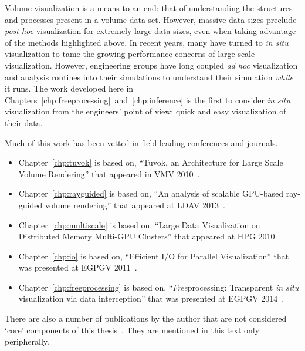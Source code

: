 Volume visualization is a means to an end: that of understanding the
structures and processes present in a volume data set.  However,
massive data
sizes preclude \textit{post hoc} visualization for extremely large data
sizes, even when taking advantage of the methods highlighted above.  In
recent
years, many have turned to \textit{in situ} visualization to tame the
growing performance concerns of large-scale visualization.  However,
engineering groups have long coupled \textit{ad hoc} visualization and
analysis routines into their simulations to understand their simulation
\emph{while} it runs.  The work developed here in
Chapters~\ref{chp:freeprocessing}~and~\ref{chp:inference} is the first
to consider
\textit{in situ} visualization from the engineers' point of view: quick
and easy visualization of their data.

Much of this work has been vetted in field-leading conferences and
journals.
\begin{itemize}

  \item Chapter~\ref{chp:tuvok} is based on, ``Tuvok, an
  Architecture for Large Scale Volume Rendering'' that appeared in VMV
  2010~\cite{Fogal:2010:Tuvok}.

	\item Chapter~\ref{chp:rayguided} is based on, ``An analysis of scalable
	GPU-based ray-guided volume rendering'' that appeared at LDAV
	2013~\cite{Fogal:2013:Analysis}.

  \item Chapter~\ref{chp:multiscale} is based on, ``Large Data
  Visualization on Distributed Memory Multi-GPU Clusters'' that
  appeared at HPG 2010~\cite{Fogal:2010:HPG}.

  \item Chapter~\ref{chp:io} is based on, ``Efficient I/O
  for Parallel Visualization'' that was presented at EGPGV
  2011~\cite{Fogal:2011:PracticalIO}.

	\item Chapter~\ref{chp:freeprocessing} is based on,
	``\textit{Free}processing: Transparent \textit{in situ} visualization via
	data interception'' that was presented at EGPGV
	2014~\cite{Fogal:2014:Freeprocessing}.

\end{itemize}

There are also a number of publications by the author that are not
considered
`core' components of this thesis~\cite{Fogal:2009:SizeMatters,
Fogal:2010:Bridge, Jevremovic:2011:Education, Jovana:2012:Interactive,
Brownlee:2012:GLuRay, Childs:2012:VisIt, Hernandez:2013:Steering,
Butson:2013:DBS}.  They are mentioned in this text only peripherally.


